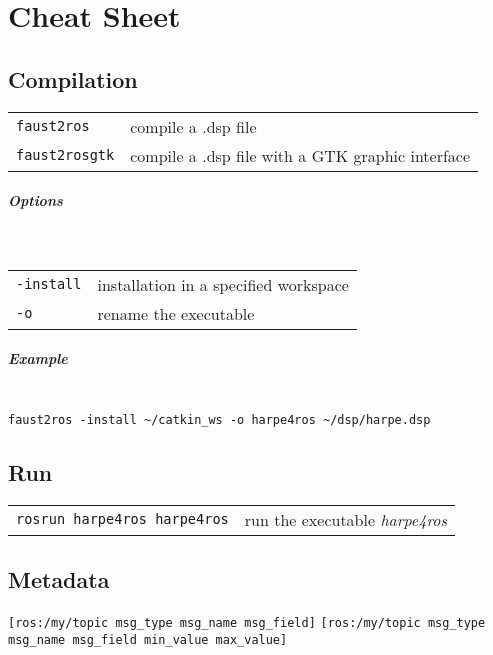 \chapter{Cheat Sheet}
\label{cheatsheet}

\section*{Compilation}
\begin{tabular}{p{2cm} p{7cm}}
\lstinline'faust2ros' & compile a .dsp file\\
\lstinline'faust2rosgtk' & compile a .dsp file with a GTK graphic interface\\
\end{tabular}

\paragraph{Options}~\\
\begin{tabular}{p{2cm} p{7cm}}
\lstinline'-install' & installation in a specified workspace\\
\lstinline'-o' & rename the executable\\
\end{tabular}

\paragraph{Example}~\\
\lstinline'faust2ros -install ~/catkin_ws -o harpe4ros ~/dsp/harpe.dsp'


\section*{Run}
\begin{tabular}{p{5cm} p{7cm}}
\lstinline'rosrun harpe4ros harpe4ros' & run the executable \textit{harpe4ros}\\
\end{tabular}
\section*{Metadata}

\lstinline'[ros:/my/topic msg_type msg_name msg_field]'\newline
\lstinline'[ros:/my/topic msg_type msg_name msg_field min_value max_value]'